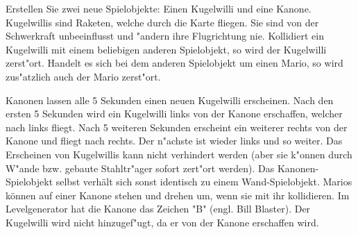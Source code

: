 Erstellen Sie zwei neue Spielobjekte: Einen Kugelwilli und eine Kanone.
Kugelwillis sind Raketen, welche durch die Karte fliegen. Sie sind von der Schwerkraft unbeeinflusst und "andern ihre Flugrichtung nie. 
Kollidiert ein Kugelwilli mit einem beliebigen anderen Spielobjekt, so wird der Kugelwilli zerst"ort. 
Handelt es sich bei dem anderen Spielobjekt um einen Mario, so wird zus"atzlich auch der Mario zerst"ort.

Kanonen lassen alle 5 Sekunden einen neuen Kugelwilli erscheinen. Nach den ersten 5 Sekunden wird ein Kugelwilli links von der Kanone erschaffen, welcher nach links fliegt.
Nach 5 weiteren Sekunden erscheint ein weiterer rechts von der Kanone und fliegt nach rechts. Der n"achste ist wieder links und so weiter. Das Erscheinen von Kugelwillis kann nicht verhindert werden (aber sie k"onnen durch W"ande bzw. gebaute Stahltr"ager sofort zert"ort werden).
Das Kanonen-Spielobjekt selbst verhält sich sonst identisch zu einem Wand-Spielobjekt. Marios können auf einer Kanone stehen und drehen um, wenn sie mit ihr kollidieren. 
Im Levelgenerator hat die Kanone das Zeichen "B" (engl. Bill Blaster). Der Kugelwilli wird nicht hinzugef"ugt, da er von der Kanone erschaffen wird.